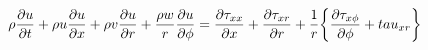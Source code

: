 \begin{equation}
  \rho\pdv{u}{t} + \rho u\pdv{u}{x} 
  + \rho v\pdv{u}{r} 
  + \frac{\rho w}{r}\pdv{u}{\phi} \\
  = \pdv{\tau_{xx}}{x} 
  + \pdv{\tau_{xr}}{r} 
  + \frac{1}{r}\bigg\{\pdv{\tau_{x\phi}}{\phi} + tau_{xr} \bigg\}
\end{equation}
